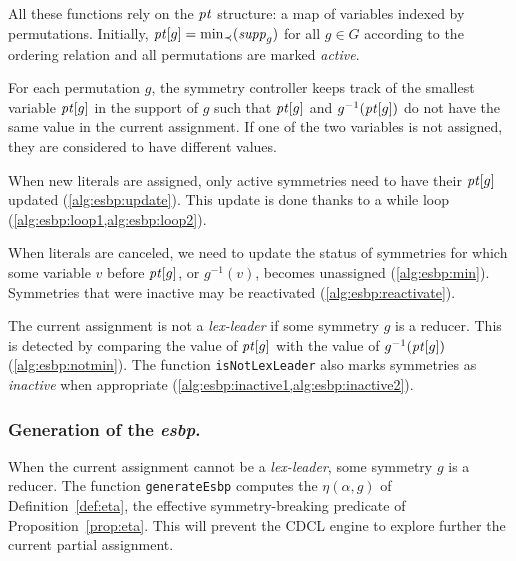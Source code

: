  All these functions rely on the $\mathit{pt}$ structure: a map of variables indexed
 by permutations. Initially, $\mathit{pt}[g] = \min_{\prec}(\mathit{supp}_g)$ for all $g \in G$ according to the ordering relation and all
 permutations are marked \textit{active}. 
 
 For each permutation $g$, the symmetry controller keeps track of the smallest
 variable $\mathit{pt}[g]$ in the support of $g$ such that $\mathit{pt}[g]$ and
 $g^{-1}(\mathit{pt}[g])$ do not have the same value in the current assignment. If
 one of the two variables is not assigned, they are considered  to have different values.
 
 When new literals are assigned, only active symmetries need to have their
 $\mathit{pt}[g]$ updated (\cref{alg:esbp:update}). This update is done thanks to a while
 loop (\cref{alg:esbp:loop1,alg:esbp:loop2}).
 
 When literals are canceled, we need to update the status of symmetries for
 which some variable $v$ before $\mathit{pt}[g]$, or $g^{-1}(v)$, becomes unassigned
 (\cref{alg:esbp:min}). Symmetries that were inactive may be reactivated (\cref{alg:esbp:reactivate}).
 
 The current assignment is not a \textit{lex-leader} if some symmetry $g$ is a
 reducer. This is detected by comparing the value of $\mathit{pt}[g]$ with the value
 of $g^{-1}(\mathit{pt}[g])$ (\cref{alg:esbp:notmin}). The function \texttt{isNotLexLeader} also
 marks symmetries as \emph{inactive} when appropriate (\cref{alg:esbp:inactive1,alg:esbp:inactive2}).
 
 \subsubsection{Generation of the \emph{esbp}.} When the current assignment
 cannot be a \textit{lex-leader}, some symmetry $g$ is a reducer. The function
 \texttt{generateEsbp} computes the $\eta(\alpha, g)$ of Definition~\ref{def:eta},
the effective symmetry-breaking predicate of Proposition~\ref{prop:eta}. This will
 prevent the CDCL engine to explore further the current partial assignment.
 
